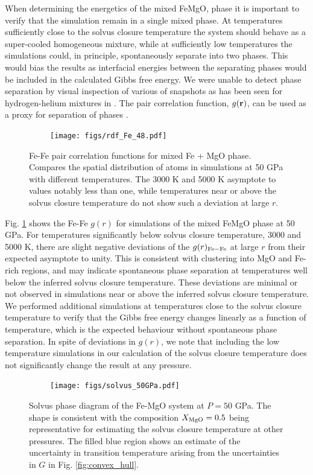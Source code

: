 When determining the energetics of the mixed FeMgO, phase it is important to verify that
the simulation remain in a single mixed phase. At temperatures sufficiently close to the
solvus closure temperature the system should behave as a super-cooled homogeneous
mixture, while at sufficiently low temperatures the simulations could, in principle,
spontaneously  separate into two phases. This would bias the results as interfacial
energies between the separating phases would be included in the calculated Gibbs free
energy.  We were unable to detect phase separation by visual inspection of various of
snapshots as has been seen for hydrogen-helium mixtures in \citep{Soubiran2012}. The pair
correlation function, $g({\bf r})$, can be used as a proxy for separation of phases
\citep{Soubiran2012}.

\begin{figure}[h!]  
  \centering
    \texttt{[image: figs/rdf\_Fe\_48.pdf]}
\caption{Fe-Fe pair correlation functions for mixed Fe + MgO phase. Compares the spatial
  distribution of atoms in simulations at 50 GPa with different temperatures. The 3000 K
  and 5000 K asymptote to values notably less than one, while temperatures near or above
  the solvus closure temperature do not show such a deviation at large $r$.}
\label{fig:rdf}
\end{figure}

Fig. \ref{fig:rdf} shows the Fe-Fe $g(r)$ for simulations of the mixed FeMgO phase at 50
GPa. For temperatures significantly below solvus closure temperature, 3000 and 5000 K,
there are slight negative deviations of the $g(r)_{\rm Fe-Fe}$ at large $r$ from their
expected asymptote to unity. This is consistent with clustering into MgO and Fe-rich
regions, and may indicate spontaneous phase separation  at temperatures well below the
inferred solvus closure temperature. These deviations are minimal or not observed in
simulations near or above the inferred solvus closure temperature. We performed
additional simulations at temperatures close to the solvus closure temperature to verify
that the Gibbs free energy changes linearly as a function of temperature, which is the
expected behaviour without spontaneous phase separation. In spite of deviations in
$g(r)$, we note that including the low temperature simulations in our calculation of the
solvus closure temperature does not significantly change the result at any pressure.

\begin{figure}[h!]  
  \centering
    \texttt{[image: figs/solvus\_50GPa.pdf]}
\caption{Solvus phase diagram of the Fe-MgO system at $P=50$ GPa. The shape is consistent
  with the composition $X_{\rm MgO}=0.5$ being representative for estimating the solvus
  closure temperature at other pressures. The filled blue region shows an estimate of the
  uncertainty in transition temperature arising from the uncertainties in $G$ in Fig.
  \ref{fig:convex_hull}.}
\label{fig:solvus}
\end{figure}


